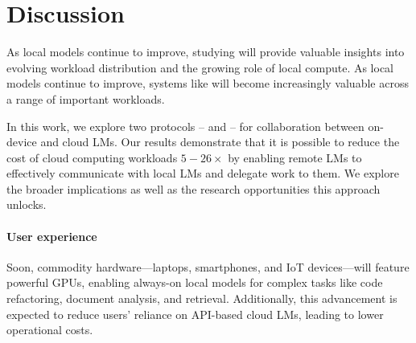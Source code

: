\vspace{-1em}\section{Discussion} 
As local models continue to improve, studying \system will provide valuable insights into evolving workload distribution and the growing role of local compute.
As local models continue to improve, systems like \system will become increasingly valuable across a range of important workloads.


In this work, we explore two protocols -- \naive and \system -- for collaboration between on-device and cloud LMs. Our results demonstrate that it is possible to reduce the cost of cloud computing workloads $5-26\times$ by enabling remote LMs to effectively communicate with local LMs and delegate work to them. We explore the broader implications as well as the research opportunities this approach unlocks.


\vspace{-0.5em}\paragraph{User experience} Soon, commodity hardware—laptops, smartphones, and IoT devices—will feature powerful GPUs, enabling always-on local models for complex tasks like code refactoring, document analysis, and retrieval. Additionally, this advancement is expected to reduce users' reliance on API-based cloud LMs, leading to lower operational costs.

